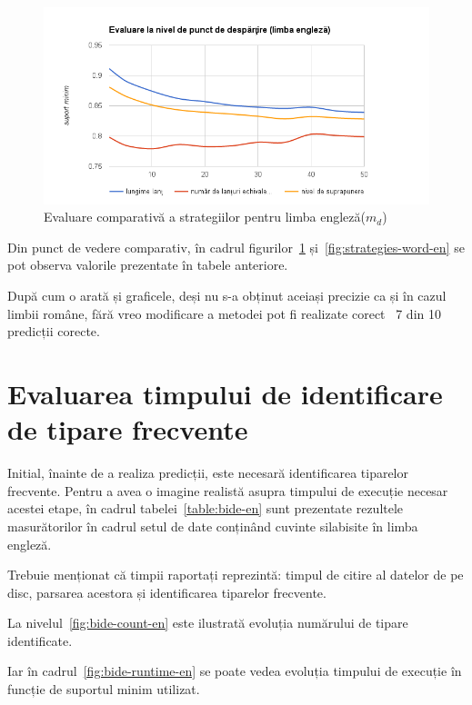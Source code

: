 \begin{figure}[h!]
    \centering
    \includegraphics[width=1\textwidth]{figures/strategies-point-en.png}
    \caption{Evaluare comparativă a strategiilor pentru limba engleză($m_d$)}
    \label{fig:strategies-point-en}
\end{figure}


Din punct de vedere comparativ, în cadrul figurilor~\ref{fig:strategies-point-en} și~\ref{fig:strategies-word-en} se pot observa valorile prezentate în tabele anteriore.

După cum o arată și graficele, deși nu s-a obținut aceiași precizie ca și în cazul limbii române, fără vreo modificare a metodei pot fi realizate corect ~7 din 10 predicții corecte. 

\section{Evaluarea timpului de identificare de tipare frecvente}

Initial, înainte de a realiza predicții, este necesară identificarea tiparelor frecvente. Pentru a avea o imagine realistă asupra timpului de execuție necesar acestei etape, în cadrul tabelei~\ref{table:bide-en} sunt prezentate rezultele masurătorilor în cadrul setul de date conținând cuvinte silabisite în limba engleză.

Trebuie menționat că timpii raportați reprezintă: timpul de citire al datelor de pe disc, parsarea acestora și  identificarea tiparelor frecvente.

La nivelul~\ref{fig:bide-count-en} este ilustrată evoluția numărului de tipare identificate.

Iar în cadrul~\ref{fig:bide-runtime-en} se poate vedea evoluția timpului de execuție în funcție de suportul minim utilizat.

